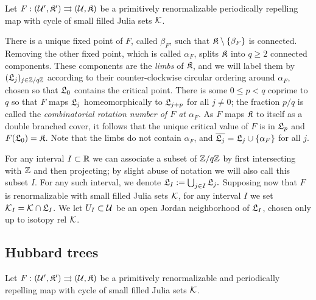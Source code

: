 \documentclass[12pt]{amsart}
\begin{document}
Let  $F: (\mathcal U', \mathfrak{K}')\rightrightarrows (\mathcal U, \mathfrak{K})$ be a primitively renormalizable periodically repelling \pql map with cycle of small filled Julia sets $\mathcal K$. 

There is a unique fixed point of $F$, called $\beta_F$,  such that $\mathfrak{K}\setminus \{\beta_F\}$ is connected.
Removing the other fixed point, which is called $\alpha_F$, splits $\mathfrak{K}$ into $q\geq 2$ connected components. 
These components are the \textit{limbs}  of $\mathfrak{K}$, and we will label them by $(\mathfrak{L}_j)_{j\in \mathbb Z/q\mathbb Z}$ according to their counter-clockwise circular ordering around $\alpha_F$, chosen so that $\mathfrak{L}_0$ contains the critical point. There is some $0 \leq p < q$ coprime to $q$ so that $F$ maps $\mathfrak{L}_j$ homeomorphically to $\mathfrak{L}_{j+p}$ for all $j \neq 0$; the fraction $p/q$ is called the \textit{combinatorial rotation number of $F$ at $\alpha_F$}. As $F$ maps $\mathfrak{K}$ to itself as a double branched cover, it follows that the unique critical value of $F$ is in $\mathfrak{L}_p$ and  $F(\mathfrak{L}_0)= \mathfrak{K}$. Note that the limbs do not contain $\alpha_F$, and $\overline{\mathfrak{L}_j} = \mathfrak{L}_j\cup \{\alpha_F\}$ for all $j$.

For any interval $I\subset \mathbb R$ we can associate a subset of $\mathbb Z/q\mathbb Z$ by first intersecting with $\mathbb Z$ and then projecting; by slight abuse of notation we will also call this subset $I$. For any such interval, we denote $\mathfrak{L}_I := \bigcup_{j\in I}\mathfrak{L}_j.$
Supposing now that $F$ is renormalizable with small filled Julia sets $\mathcal K$, for any interval $I$ we set $\mathcal K_I = \mathcal K\cap \mathfrak{L}_I$. We let $U_I\subset \mathcal U$ be an open Jordan neighborhood of $\mathfrak{L}_I$, chosen only up to isotopy rel $\mathcal K$. 







\subsection{Hubbard trees}\label{sec:hubbard trees}

Let  $F: (\mathcal U', \mathfrak{K}')\rightrightarrows (\mathcal U, \mathfrak{K})$ be a primitively renormalizable and periodically repelling \pql map with cycle of small filled Julia sets $\mathcal K$.
\end{document}
